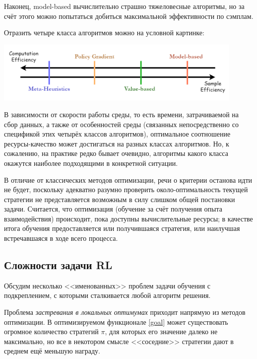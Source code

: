 Наконец, model-based вычислительно страшно тяжеловесные алгоритмы, но за счёт этого можно попытаться добиться максимальной эффективности по сэмплам. 

Отразить четыре класса алгоритмов можно на условной картинке:

\begin{center}
    \includegraphics[width=0.9\textwidth]{Images/SampleEfficiency.png}
\end{center}

В зависимости от скорости работы среды, то есть времени, затрачиваемой на сбор данных, а также от особенностей среды (связанных непосредственно со спецификой этих четырёх классов алгоритмов), оптимальное соотношение ресурсы-качество может достигаться на разных классах алгоритмов. Но, к сожалению, на практике редко бывает очевидно, алгоритмы какого класса окажутся наиболее подходящими в конкретной ситуации.

В отличие от классических методов оптимизации, речи о критерии останова идти не будет, поскольку адекватно разумно проверить около-оптимальность текущей стратегии не представляется возможным в силу слишком общей постановки задачи. Считается, что оптимизация (обучение за счёт получения опыта взаимодействия) происходит, пока доступны вычислительные ресурсы; в качестве итога обучения предоставляется или получившаяся стратегия, или наилучшая встречавшаяся в ходе всего процесса.

\subsection{Сложности задачи RL}\label{RLproblems}

Обсудим несколько <<именованных>> проблем задачи обучения с подкреплением, с которыми сталкивается любой алгоритм решения.

Проблема \emph{застревания в локальных оптимумах} приходит напрямую из методов оптимизации. В оптимизируемом функционале \eqref{goal} может существовать огромное количество стратегий $\pi$, для которых его значение далеко не максимально, но все в некотором смысле <<соседние>> стратегии дают в среднем ещё меньшую награду.


